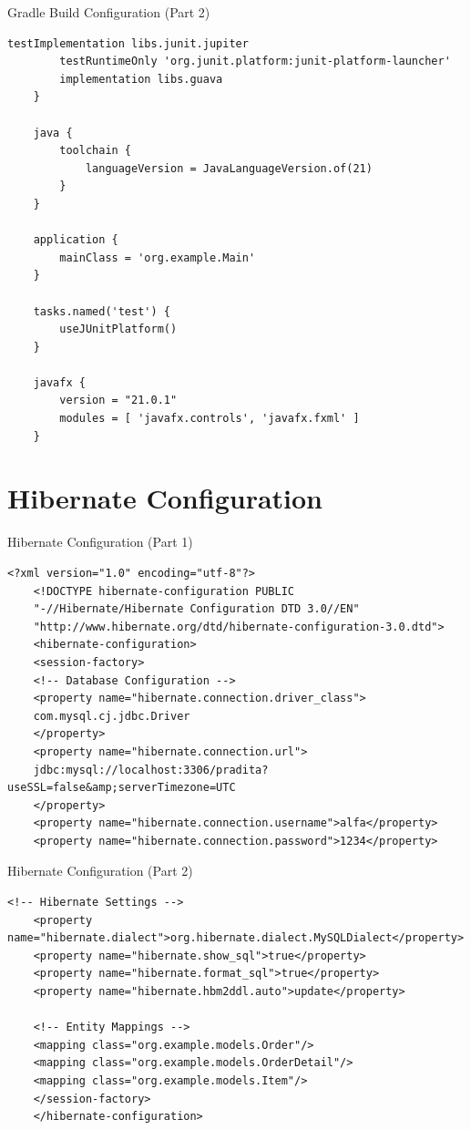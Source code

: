 \documentclass[aspectratio=169, table]{beamer}
\begin{document}
\begin{frame}[fragile]{Gradle Build Configuration (Part 2)}
	\vspace{20pt}
	\begin{lstlisting}[style=JavaStyle]
		testImplementation libs.junit.jupiter
		testRuntimeOnly 'org.junit.platform:junit-platform-launcher'
		implementation libs.guava
	}
	
	java {
		toolchain {
			languageVersion = JavaLanguageVersion.of(21)
		}
	}
	
	application {
		mainClass = 'org.example.Main'
	}
	
	tasks.named('test') {
		useJUnitPlatform()
	}
	
	javafx {
		version = "21.0.1"
		modules = [ 'javafx.controls', 'javafx.fxml' ]
	}
\end{lstlisting}
\end{frame}

\section{Hibernate Configuration}
\begin{frame}[fragile]{Hibernate Configuration (Part 1)}
\vspace{20pt}
\begin{lstlisting}[style=XmlStyle]
	<?xml version="1.0" encoding="utf-8"?>
	<!DOCTYPE hibernate-configuration PUBLIC 
	"-//Hibernate/Hibernate Configuration DTD 3.0//EN"
	"http://www.hibernate.org/dtd/hibernate-configuration-3.0.dtd">
	<hibernate-configuration>
	<session-factory>
	<!-- Database Configuration -->
	<property name="hibernate.connection.driver_class">
	com.mysql.cj.jdbc.Driver
	</property>
	<property name="hibernate.connection.url">
	jdbc:mysql://localhost:3306/pradita?useSSL=false&amp;serverTimezone=UTC
	</property>
	<property name="hibernate.connection.username">alfa</property>
	<property name="hibernate.connection.password">1234</property>
\end{lstlisting}
\end{frame}

\begin{frame}[fragile]{Hibernate Configuration (Part 2)}
\vspace{20pt}
\begin{lstlisting}[style=XmlStyle]
	<!-- Hibernate Settings -->
	<property name="hibernate.dialect">org.hibernate.dialect.MySQLDialect</property>
	<property name="hibernate.show_sql">true</property>
	<property name="hibernate.format_sql">true</property>
	<property name="hibernate.hbm2ddl.auto">update</property>
	
	<!-- Entity Mappings -->
	<mapping class="org.example.models.Order"/>
	<mapping class="org.example.models.OrderDetail"/>
	<mapping class="org.example.models.Item"/>
	</session-factory>
	</hibernate-configuration>
\end{lstlisting}
\end{frame}
\end{document}
